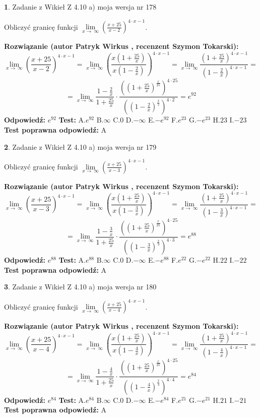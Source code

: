 \documentclass[12pt, a4paper]{article}
\theoremstyle{definition} %
\newtheorem{zad}{}
\newcommand{\zadStart}[1]{\begin{zad}#1\newline}
\newcommand{\zadStop}{\end{zad}}
\newcommand{\rozwStart}[2]{\noindent \textbf{Rozwiązanie (autor #1 , recenzent #2): }\newline}
\newcommand{\rozwStop}{\newline}
\newcommand{\odpStart}{\noindent \textbf{Odpowiedź:}\newline}
\newcommand{\odpStop}{\newline}
\newcommand{\testStart}{\noindent \textbf{Test:}\newline}
\newcommand{\testStop}{\newline}
\newcommand{\kluczStart}{\noindent \textbf{Test poprawna odpowiedź:}\newline}
\newcommand{\kluczStop}{\newline}
\begin{document}
\zadStart{Zadanie z Wikieł Z 4.10 a) moja wersja nr 178}

Obliczyć granicę funkcji  $\lim\limits_{x\to\ \infty}(\frac{x+25}{x-2})^{4\cdot x-1}$.
\zadStop
\rozwStart{Patryk Wirkus}{Szymon Tokarski}
$$\lim\limits_{x\to\ \infty}(\frac{x+25}{x-2})^{4\cdot x-1} = \lim\limits_{x\to\ \infty}(\frac{x(1+\frac{25}{x})}{x(1-\frac{2}{x})})^{4\cdot x-1}=\lim\limits_{x\to\ \infty}\frac{(1+\frac{25}{x})^{4\cdot x-1}}{(1-\frac{2}{x})^{4\cdot x-1}}=$$
$$=\lim\limits_{x\to\ \infty}\frac{1-\frac{2}{x}}{1+\frac{25}{x}}\cdot\frac{((1+\frac{25}{x})^{\frac{x}{25}})^{4\cdot25}}{((1-\frac{2}{x})^{\frac{x}{2}})^{4\cdot2}}=e^{92}$$
\rozwStop
\odpStart
$e^{92}$
\odpStop
\testStart
A.$e^{92}$ B.$\infty$ C.$0$ D.$-\infty$ E.$-e^{92}$
F.$e^{23}$ G.$-e^{23}$
H.$23$
I.$-23$
\testStop
\kluczStart
A
\kluczStop



\zadStart{Zadanie z Wikieł Z 4.10 a) moja wersja nr 179}

Obliczyć granicę funkcji  $\lim\limits_{x\to\ \infty}(\frac{x+25}{x-3})^{4\cdot x-1}$.
\zadStop
\rozwStart{Patryk Wirkus}{Szymon Tokarski}
$$\lim\limits_{x\to\ \infty}(\frac{x+25}{x-3})^{4\cdot x-1} = \lim\limits_{x\to\ \infty}(\frac{x(1+\frac{25}{x})}{x(1-\frac{3}{x})})^{4\cdot x-1}=\lim\limits_{x\to\ \infty}\frac{(1+\frac{25}{x})^{4\cdot x-1}}{(1-\frac{3}{x})^{4\cdot x-1}}=$$
$$=\lim\limits_{x\to\ \infty}\frac{1-\frac{3}{x}}{1+\frac{25}{x}}\cdot\frac{((1+\frac{25}{x})^{\frac{x}{25}})^{4\cdot25}}{((1-\frac{3}{x})^{\frac{x}{3}})^{4\cdot3}}=e^{88}$$
\rozwStop
\odpStart
$e^{88}$
\odpStop
\testStart
A.$e^{88}$ B.$\infty$ C.$0$ D.$-\infty$ E.$-e^{88}$
F.$e^{22}$ G.$-e^{22}$
H.$22$
I.$-22$
\testStop
\kluczStart
A
\kluczStop



\zadStart{Zadanie z Wikieł Z 4.10 a) moja wersja nr 180}

Obliczyć granicę funkcji  $\lim\limits_{x\to\ \infty}(\frac{x+25}{x-4})^{4\cdot x-1}$.
\zadStop
\rozwStart{Patryk Wirkus}{Szymon Tokarski}
$$\lim\limits_{x\to\ \infty}(\frac{x+25}{x-4})^{4\cdot x-1} = \lim\limits_{x\to\ \infty}(\frac{x(1+\frac{25}{x})}{x(1-\frac{4}{x})})^{4\cdot x-1}=\lim\limits_{x\to\ \infty}\frac{(1+\frac{25}{x})^{4\cdot x-1}}{(1-\frac{4}{x})^{4\cdot x-1}}=$$
$$=\lim\limits_{x\to\ \infty}\frac{1-\frac{4}{x}}{1+\frac{25}{x}}\cdot\frac{((1+\frac{25}{x})^{\frac{x}{25}})^{4\cdot25}}{((1-\frac{4}{x})^{\frac{x}{4}})^{4\cdot4}}=e^{84}$$
\rozwStop
\odpStart
$e^{84}$
\odpStop
\testStart
A.$e^{84}$ B.$\infty$ C.$0$ D.$-\infty$ E.$-e^{84}$
F.$e^{21}$ G.$-e^{21}$
H.$21$
I.$-21$
\testStop
\kluczStart
A
\kluczStop
\end{document}
